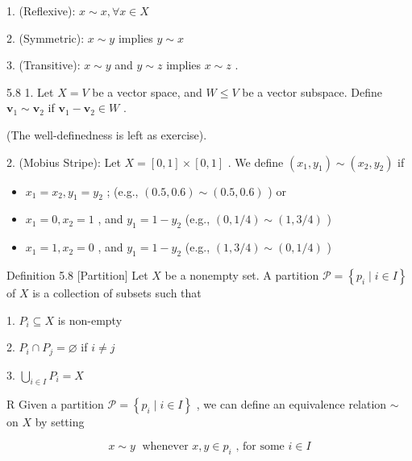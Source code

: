 1. (Reflexive): \(x \sim  x,\forall x \in  X\)

2. (Symmetric): \(x \sim  y\) implies \(y \sim  x\)

3. (Transitive): \(x \sim  y\) and \(y \sim  z\) implies \(x \sim  z\) .

5.8 1. Let \(X = V\) be a vector space, and \(W \leq  V\) be a vector subspace. Define \({\mathbf{v}}_{1} \sim  {\mathbf{v}}_{2}\) if \({\mathbf{v}}_{1} - {\mathbf{v}}_{2} \in  W\) .

(The well-definedness is left as exercise).

2. (Mobius Stripe): Let \(X = \left\lbrack  {0,1}\right\rbrack   \times  \left\lbrack  {0,1}\right\rbrack\) . We define \(\left( {{x}_{1},{y}_{1}}\right)  \sim  \left( {{x}_{2},{y}_{2}}\right)\) if

\begin{itemize}
\item \({x}_{1} = {x}_{2},{y}_{1} = {y}_{2}\) ; (e.g., \(\left( {{0.5},{0.6}}\right)  \sim  \left( {{0.5},{0.6}}\right)\) ) or
\end{itemize}

\begin{itemize}
\item \({x}_{1} = 0,{x}_{2} = 1\) , and \({y}_{1} = 1 - {y}_{2}\) (e.g., \(\left( {0,1/4}\right)  \sim  \left( {1,3/4}\right)\) )
\end{itemize}

\begin{itemize}
\item \({x}_{1} = 1,{x}_{2} = 0\) , and \({y}_{1} = 1 - {y}_{2}\) (e.g., \(\left( {1,3/4}\right)  \sim  \left( {0,1/4}\right)\) )
\end{itemize}

Definition 5.8 [Partition] Let \(X\) be a nonempty set. A partition \(\mathcal{P} = \left\{  {{p}_{i} \mid  i \in  I}\right\}\) of \(X\) is a collection of subsets such that

1. \({P}_{i} \subseteq  X\) is non-empty

2. \({P}_{i} \cap  {P}_{j} = \varnothing\) if \(i \neq  j\)

3. \(\mathop{\bigcup }\limits_{{i \in  I}}{P}_{i} = X\)

R Given a partition \(\mathcal{P} = \left\{  {{p}_{i} \mid  i \in  I}\right\}\) , we can define an equivalence relation \(\sim\) on \(X\) by setting

\[
x \sim  y\;\text{ whenever }x,y \in  {p}_{i}\text{ , for some }i \in  I
\]

